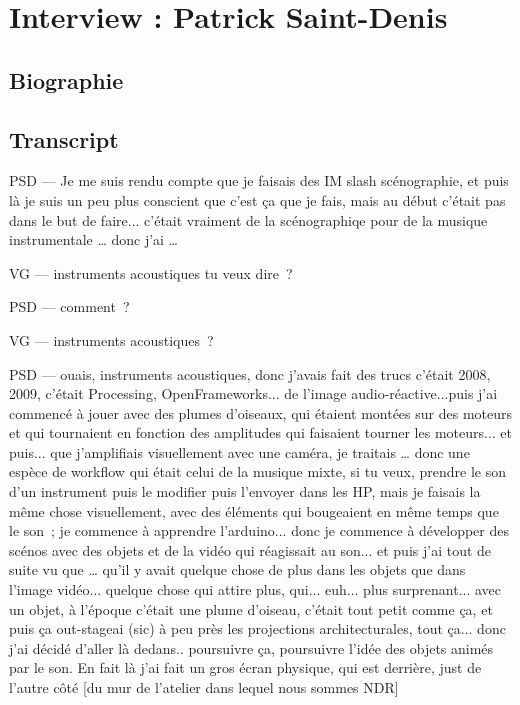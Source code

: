 \chapter{Interview : Patrick Saint-Denis}

\section*{Biographie}


\section*{Transcript}

PSD — Je me suis rendu compte que je faisais des IM slash scénographie, et puis là je suis un peu plus conscient que c'est ça que je fais, mais au début c'était pas dans le but de faire... c'était vraiment de la scénographiqe pour de la musique instrumentale … donc j'ai … 

VG — instruments acoustiques tu veux dire ? 

PSD — comment ? 

VG — instruments acoustiques ? 

PSD — ouais, instruments acoustiques, donc j'avais fait des trucs c'était 2008, 2009, c'était Processing, OpenFrameworks... de l'image audio-réactive...puis j'ai commencé à jouer avec des plumes d'oiseaux, qui étaient montées sur des moteurs et qui tournaient en fonction des amplitudes qui faisaient tourner les moteurs... et puis... que j'amplifiais visuellement avec une caméra, je traitais … donc une espèce de workflow qui était celui de la musique mixte, si tu veux, prendre le son d'un instrument puis le modifier puis l'envoyer dans les HP, mais je faisais la même chose visuellement, avec des éléments qui bougeaient en même temps que le son ; je commence à apprendre l'arduino... donc je commence à développer des scénos avec des objets et de la vidéo qui réagissait au son... et puis j'ai tout de suite vu que … qu'il y avait quelque chose de plus dans les objets que dans l'image vidéo... quelque chose qui attire plus, qui... euh... plus surprenant... avec un objet, à l'époque c'était une plume d'oiseau, c'était tout petit comme ça, et puis ça out-stageai (sic) à peu près les projections architecturales, tout ça... donc j'ai décidé d'aller là dedans.. poursuivre ça, poursuivre l'idée des objets animés par le son. En fait là j'ai fait un gros écran physique, qui est derrière, just de l'autre côté [du mur de l'atelier dans lequel nous sommes NDR]  

